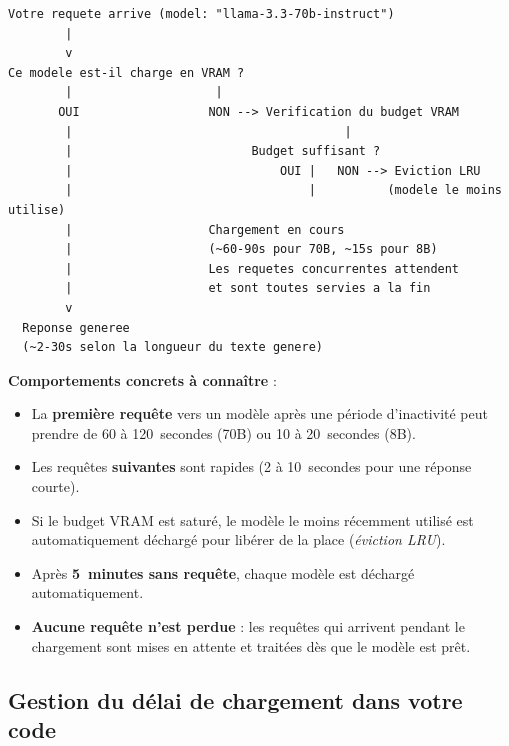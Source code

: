 \documentclass[12pt, a4paper, twoside]{article}
\begin{document}
\begin{lstlisting}[style=bashstyle, frame=single, caption={Cycle de vie d'un modèle lors d'une requête}]
Votre requete arrive (model: "llama-3.3-70b-instruct")
        |
        v
Ce modele est-il charge en VRAM ?
        |                    |
       OUI                  NON --> Verification du budget VRAM
        |                                      |
        |                         Budget suffisant ?
        |                             OUI |   NON --> Eviction LRU
        |                                 |          (modele le moins utilise)
        |                   Chargement en cours
        |                   (~60-90s pour 70B, ~15s pour 8B)
        |                   Les requetes concurrentes attendent
        |                   et sont toutes servies a la fin
        v
  Reponse generee
  (~2-30s selon la longueur du texte genere)
\end{lstlisting}

\textbf{Comportements concrets à connaître} :
\begin{itemize}
  \item La \textbf{première requête} vers un modèle après une période d'inactivité peut
        prendre de 60 à 120~secondes (70B) ou 10 à 20~secondes (8B).
  \item Les requêtes \textbf{suivantes} sont rapides (2 à 10~secondes pour une réponse courte).
  \item Si le budget VRAM est saturé, le modèle le moins récemment utilisé est automatiquement
        déchargé pour libérer de la place (\textit{éviction LRU}).
  \item Après \textbf{5~minutes sans requête}, chaque modèle est déchargé automatiquement.
  \item \textbf{Aucune requête n'est perdue} : les requêtes qui arrivent pendant le chargement
        sont mises en attente et traitées dès que le modèle est prêt.
\end{itemize}

\subsection{Gestion du délai de chargement dans votre code}
\end{document}
